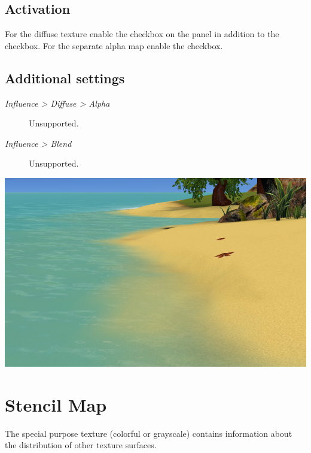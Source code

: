 \documentclass[a4paper,12pt,oneside]{sphinxmanual}
\begin{document}
\subsection{Activation}
\label{textures:id12}
For the diffuse texture enable the  checkbox on the  panel in addition to the  checkbox. For the separate alpha map enable the  checkbox.


\subsection{Additional settings}
\label{textures:id13}\begin{description}
\item[{\emph{Influence \textgreater{} Diffuse \textgreater{} Alpha}}] \leavevmode
Unsupported.

\item[{\emph{Influence \textgreater{} Blend}}] \leavevmode
Unsupported.

\end{description}

{\hfill\includegraphics[width=1.000\linewidth]{alpha_map_water.jpg}\hfill}

\begin{DUlineblock}{0em}
\item[] 
\end{DUlineblock}


\section{Stencil Map}
\label{textures:stencil-map}\label{textures:index-9}
The special purpose texture (colorful or grayscale) contains information about the distribution of other texture surfaces.
\end{document}
